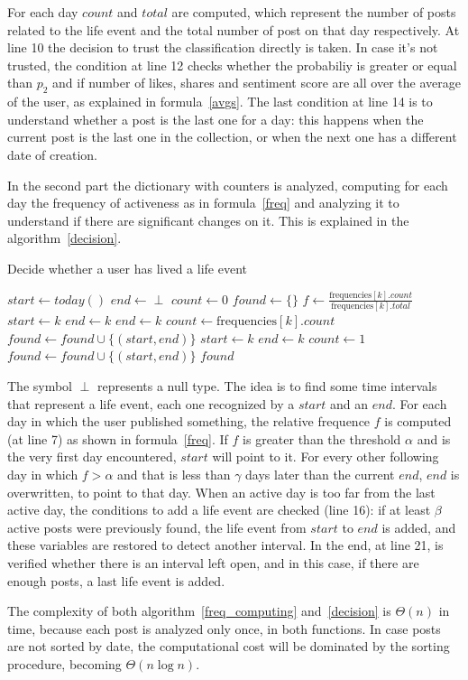 For each day $count$ and $total$ are computed, which represent the number of posts related to the life event and the total number of post on that day respectively. At line 10 the decision to trust the classification directly is taken. In case it's not trusted, the condition at line 12 checks whether the probabiliy is greater or equal than $p_2$ and if number of likes, shares and sentiment score are all over the average of the user, as explained in formula~\ref{avgs}. The last condition at line 14 is to understand whether a post is the last one for a day: this happens when the current post is the last one in the collection, or when the next one has a different date of creation.

In the second part the dictionary with counters is analyzed, computing for each day the frequency of activeness as in formula~\ref{freq} and analyzing it to understand if there are significant changes on it. This is explained in the algorithm~\ref{decision}.

\begin{algorithm}
\caption{Decide whether a user has lived a life event}
\label{decision}
\begin{algorithmic}[1]
\State $start \gets today()$
\State $end \gets \perp$
\State $count \gets 0$
\State $found \gets \{\}$
	\State $f \gets \frac{\text{frequencies}[k].count}{\text{frequencies}[k].total}$
			\State $start \gets k$
			\State $end \gets k$
		\EndIf
			\State $end \gets k$
			\State $count \gets \text{frequencies}[k].count$
		\Else
				\State $found \gets found \cup \{(start, end)\}$
			\EndIf
			\State $start \gets k$
			\State $end \gets k$
			\State $count \gets 1$
		\EndIf
	\EndIf
\EndFor
{}
	\State $found \gets found \cup \{(start, end)\}$
\EndIf
\Return $found$
\EndFunction
\end{algorithmic}
\end{algorithm}

The symbol $\perp$ represents a null type. The idea is to find some time intervals that represent a life event, each one recognized by a $start$ and an $end$. For each day in which the user published something, the relative frequence $f$ is computed (at line 7) as shown in formula~\ref{freq}. If $f$ is greater than the threshold $\alpha$ and is the very first day encountered, $start$ will point to it. For every other following day in which $f > \alpha$ and that is less than $\gamma$ days later than the current $end$, $end$ is overwritten, to point to that day. When an active day is too far from the last active day, the conditions to add a life event are checked (line 16): if at least $\beta$ active posts were previously found, the life event from $start$ to $end$ is added, and these variables are restored to detect another interval. In the end, at line 21, is verified whether there is an interval left open, and in this case, if there are enough posts, a last life event is added.

The complexity of both algorithm~\ref{freq_computing} and~\ref{decision} is $\Theta(n)$ in time, because each post is analyzed only once, in both functions. In case posts are not sorted by date, the computational cost will be dominated by the sorting procedure, becoming $\Theta(n \log n)$.

